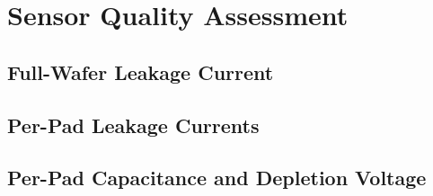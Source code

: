 \section{Sensor Quality Assessment}
\label{sec:QA}

\subsection{Full-Wafer Leakage Current}
\label{subsec:QA_Itot}

\subsection{Per-Pad Leakage Currents}
\label{subsec:QA_Ipad}

\subsection{Per-Pad Capacitance and Depletion Voltage}
\label{subsec:QA_Vdep}
